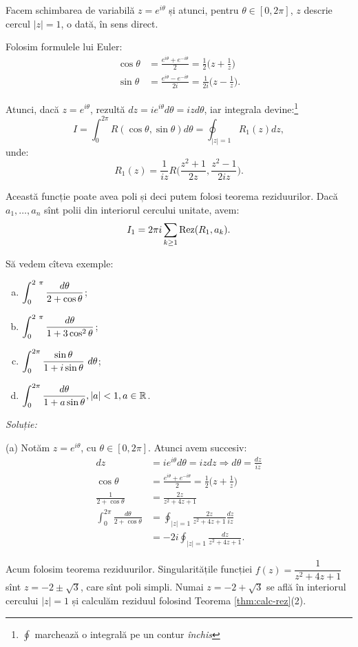 Facem schimbarea de variabilă $ z = e^{i\theta} $ și atunci, pentru $ \theta \in [0, 2\pi] $,
$ z $ descrie cercul $ |z| = 1 $, o dată, în sens direct.

Folosim formulele lui Euler:
\begin{align*}
  \cos \theta &= \frac{e^{i\theta} + e^{-i\theta}}{2} = \frac{1}{2} \Big( z + \frac{1}{z} \Big) \\
  \sin \theta &= \frac{e^{i\theta} - e^{-i\theta}}{2i} = \frac{1}{2i} \Big( z - \frac{1}{z} \Big).
\end{align*}

Atunci, dacă $ z = e^{i\theta} $, rezultă $ dz = ie^{i\theta} d\theta = izd\theta $,
iar integrala devine:\footnote{$\oint$ marchează o integrală pe un contur \emph{închis}}
\[
  I = \int_0^{2 \pi} R(\cos \theta, \sin \theta) d\theta = \oint_{|z| = 1} R_1(z) dz,
\]
unde:
\[
  R_1(z) = \frac{1}{iz} R\Big( \frac{z^2 + 1}{2z}, \frac{z^2 - 1}{2iz} \Big).
\]

Această funcție poate avea poli și deci putem folosi teorema reziduurilor. Dacă
$ a_1, \dots, a_n $ sînt polii din interiorul cercului unitate, avem:
\[
  I_1 = 2 \pi i \sum_{k \geq 1} \mathrm{Rez}(R_1, a_k).
\]

\vspace{1cm}

Să vedem cîteva exemple:
\begin{enumerate}[(a)]
\item $ \ds\int_0^{2 \pi} \frac{d\theta}{2 + \cos \theta} $;
\item $ \ds\int_0^{2 \pi} \frac{d\theta}{1 + 3 \cos^2 \theta} $;
\item $ \ds\int_0^{2 \pi} \frac{\sin \theta}{1 + i \sin \theta} d\theta $;
\item $ \displaystyle\int_0^{2 \pi} \frac{d\theta}{1 + a \sin \theta}, |a| < 1, a \in \mathbb{R} $.
\end{enumerate}

\emph{Soluție:}

(a) Notăm $ z = e^{i\theta} $, cu $ \theta \in [0, 2\pi] $. Atunci avem succesiv:
\begin{align*}
  dz &= ie^{i\theta} d\theta = izdz \Rightarrow d\theta = \frac{dz}{iz} \\
  \cos \theta &= \frac{e^{i\theta} + e^{-i\theta}}{2} = \frac{1}{2} \Big( z + \frac{1}{z} \Big) \\
  \frac{1}{2 + \cos \theta} &= \frac{2z}{z^2 + 4z + 1} \\
  \int_0^{2 \pi} \frac{d\theta}{2 + \cos \theta} &= \oint_{|z| = 1} \frac{2z}{z^2 + 4z + 1} \frac{dz}{iz} \\
     &= -2i \oint_{|z| = 1} \frac{dz}{z^2 + 4z + 1}.
\end{align*}

Acum folosim teorema reziduurilor. Singularitățile funcției $ f(z) = \dfrac{1}{z^2 + 4z + 1} $
sînt $ z = -2 \pm \sqrt{3} $, care sînt poli simpli. Numai $ z = -2 + \sqrt{3} $ se află
în interiorul cercului $ |z| = 1 $ și calculăm reziduul folosind
Teorema \ref{thm:calc-rez}(2).


